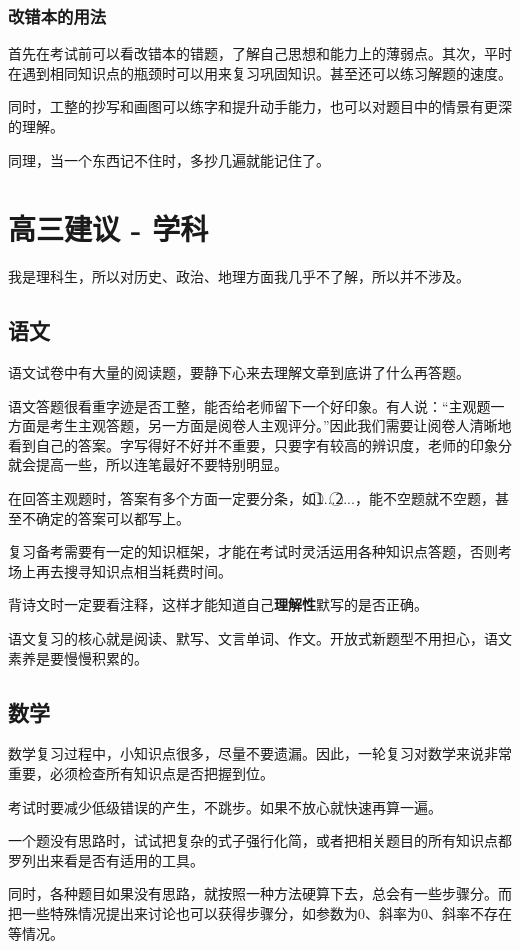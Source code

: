 \documentclass[UTF8,11pt,a4paper]{ctexart}
\begin{document}
			\subsubsection{改错本的用法}
				首先在考试前可以看改错本的错题，了解自己思想和能力上的薄弱点。其次，平时在遇到相同知识点的瓶颈时可以用来复习巩固知识。甚至还可以练习解题的速度。
				
				同时，工整的抄写和画图可以练字和提升动手能力，也可以对题目中的情景有更深的理解。
				
				{\color[gray]{0.6}同理，当一个东西记不住时，多抄几遍就能记住了。}
	\section{高三建议 - 学科}
		我是理科生，所以对历史、政治、地理方面我几乎不了解，所以并不涉及。
		\subsection{语文}
			语文试卷中有大量的阅读题，要静下心来去理解文章到底讲了什么再答题。
			
			语文答题很看重字迹是否工整，能否给老师留下一个好印象。有人说：“主观题一方面是考生主观答题，另一方面是阅卷人主观评分。”因此我们需要让阅卷人清晰地看到自己的答案。字写得好不好并不重要，只要字有较高的辨识度，老师的印象分就会提高一些，所以连笔最好不要特别明显。
			
			在回答主观题时，答案有多个方面一定要分条，如\textcircled1...\textcircled2...，能不空题就不空题，甚至不确定的答案可以都写上。
			
			复习备考需要有一定的知识框架，才能在考试时灵活运用各种知识点答题，否则考场上再去搜寻知识点相当耗费时间。
			
			背诗文时一定要看注释，这样才能知道自己\textbf{理解性}默写的是否正确。
			
			语文复习的核心就是阅读、默写、文言单词、作文。开放式新题型不用担心，语文素养是要慢慢积累的。
		\subsection{数学}
			数学复习过程中，小知识点很多，尽量不要遗漏。因此，一轮复习对数学来说非常重要，必须检查所有知识点是否把握到位。
			
			考试时要减少低级错误的产生，不跳步。如果不放心就快速再算一遍。
			
			一个题没有思路时，试试把复杂的式子强行化简，或者把相关题目的所有知识点都罗列出来看是否有适用的工具。
			
			同时，各种题目如果没有思路，就按照一种方法硬算下去，总会有一些步骤分。而把一些特殊情况提出来讨论也可以获得步骤分，如参数为0、斜率为0、斜率不存在等情况。
			
\end{document}

